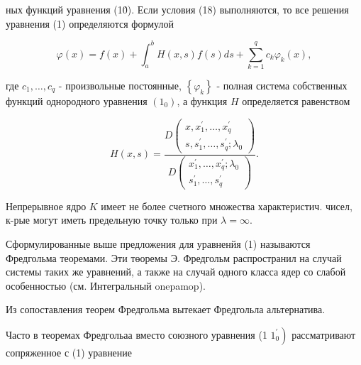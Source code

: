 \documentclass[10pt]{article}
\begin{document}
ных функций уравнения (10́). Если условия (18) выполняются, то все решения уравнения (1) определяются формулой



\[

\varphi(x)=f(x)+\int_{a}^{b} H(x, s) f(s) d s+\sum_{k=1}^{q} c_{k} \varphi_{k}(x),

\]



где $c_{1}, \ldots, c_{q}$ - произвольные постоянные, $\left\{\varphi_{k}\right\}$ - полная система собственных функций однородного уравнения $\left(1_{0}\right)$, а функция $H$ определяется равенством



\[

H(x, s)=\frac{D\left(\begin{array}{l}

x, x_{1}^{\prime}, \ldots, x_{q}^{\prime} \\

s, s_{1}^{\prime}, \ldots, s_{q}^{\prime} ; \lambda_{0}

\end{array}\right)}{D\left(\begin{array}{l}

x_{1}^{\prime}, \ldots, x_{q}^{\prime} ; \lambda_{0} \\

s_{1}^{\prime}, \ldots, s_{q}^{\prime}

\end{array}\right)} .

\]



Непрерывное ядро $K$ имеет не более счетного множества характеристич. чисел, к-рые могут иметь предельную точку только при $\lambda=\infty$.



Сформулированные выше предложения для уравненйя (1) называются Фредгольма теоремами. Эти төоремы Э. Фредгольм распространил на случай системы таких же уравнений, а также на случай одного класса ядер со слабой особенностью (см. Интегральный onepamop).



Из сопоставления теорем Фредгольма вытекает Фредгольла альтернатива.



Часто в теоремах Фредгольаа вместо союзного уравнения (1 $\left.1_{0}^{\prime}\right)$ рассматривают сопряженное с (1) уравнение
\end{document}
